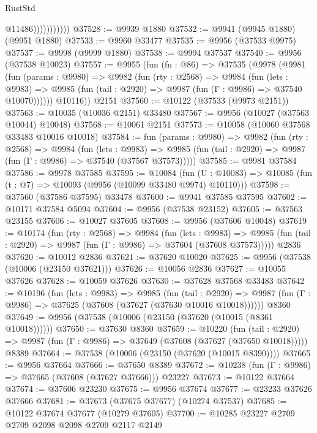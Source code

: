 \begin{lexlean}{RustStd}
\begin{coremodule}
                          @11486)))))))))))
@37528 := @9939 @1880
@37532 := @9941 (@9945 @1880) (@9951 @1880)
@37533 := @9960 @33477
@37535 := @9956 (@37533 @9975)
@37537 := @9998 (@9999 @1880)
@37538 := @9994 @37537
@37540 := @9956 (@37538 @10023)
@37557 := @9955
    (fun (fn : @86) =>
    @37535
      (@9978
        (@9981
          (fun (params : @9980) =>
          @9982
            (fun (rty : @2568) =>
            @9984
              (fun (lets : @9983) =>
              @9985 (fun (tail : @2920) => @9987 (fun (Γ : @9986) => @37540 @10070))))))
        @10116))
    @2151
@37560 := @10122 (@37533 (@9973 @2151))
@37563 := @10035 (@10036 @2151) @33480
@37567 := @9956 (@10027 (@37563 @10044) @10048)
@37568 := @10061 @2151
@37573 := @10058 (@10060 @37568 @33483 @10016 @10018)
@37584 := fun (params : @9980) =>
  @9982
    (fun (rty : @2568) =>
    @9984
      (fun (lets : @9983) =>
      @9985 (fun (tail : @2920) => @9987 (fun (Γ : @9986) => @37540 (@37567 @37573)))))
@37585 := @9981 @37584
@37586 := @9978 @37585
@37595 := @10084
    (fun (U : @10083) => @10085 (fun (t : @7) => @10093 (@9956 (@10099 @33480 @9974) @10110)))
@37598 := @37560 (@37586 @37595) @33478
@37600 := @9941 @37585 @37595
@37602 := @10171 @37584 @5094
@37604 := @9956 (@37538 @23152)
@37605 := @37563 @23155
@37606 := @10027 @37605
@37608 := @9956 (@37606 @10048)
@37619 := @10174
    (fun (rty : @2568) =>
    @9984
      (fun (lets : @9983) =>
      @9985 (fun (tail : @2920) => @9987 (fun (Γ : @9986) => @37604 (@37608 @37573)))))
    @2836
@37620 := @10012 @2836
@37621 := @37620 @10020
@37625 := @9956 (@37538 (@10006 (@23150 @37621)))
@37626 := @10056 @2836
@37627 := @10055 @37626
@37628 := @10059 @37626
@37630 := @37628 @37568 @33483
@37642 := @10196
    (fun (lets : @9983) =>
    @9985
      (fun (tail : @2920) =>
      @9987 (fun (Γ : @9986) => @37625 (@37608 (@37627 (@37630 @10016 @10018))))))
    @8360
@37649 := @9956 (@37538 (@10006 (@23150 (@37620 (@10015 (@8361 @10018))))))
@37650 := @37630 @8360
@37659 := @10220
    (fun (tail : @2920) => @9987 (fun (Γ : @9986) => @37649 (@37608 (@37627 (@37650 @10018)))))
    @8389
@37664 := @37538 (@10006 (@23150 (@37620 (@10015 @8390))))
@37665 := @9956 @37664
@37666 := @37650 @8389
@37672 := @10238 (fun (Γ : @9986) => @37665 (@37608 (@37627 @37666))) @23227
@37673 := @10122 @37664
@37674 := @37606 @23230
@37675 := @9956 @37674
@37677 := @23233 @37626 @37666
@37681 := @37673 (@37675 @37677) (@10274 @37537)
@37685 := @10122 @37674 @37677 (@10279 @37605)
@37700 := @10285
    @23227
    @2709
    @2709
    @2098
    @2098
    @2709
    @2117
    @2149

\end{coremodule}
\end{lexlean}

